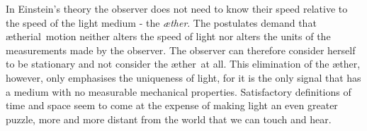 \documentclass[10pt, fleqn,final,showtrims,oldfontcommands, article,a4paper,oneside]{memoir} %
\newcommand{\aether}{\ae ther}
\newcommand{\aetherial}{\ae therial}
\newcommand*\herself {herself\xspace}
\begin{document}
In Einstein's  theory the observer does  not need to know their speed relative to the speed of the light medium - the {\em \aether}.
The postulates demand that \aetherial\ motion  neither alters the speed of light
nor alters the units of the measurements made by the observer.
%
The observer can therefore consider \herself to be stationary and not consider the \aether\ at all.
This elimination of the \aether, however, only emphasises the uniqueness of light, for it is the  only  signal that has a  medium with no measurable mechanical properties.
Satisfactory definitions of time and space seem to come at the expense of making light  an even greater puzzle,
more and more distant from the world that we can touch and hear.
\end{document}
